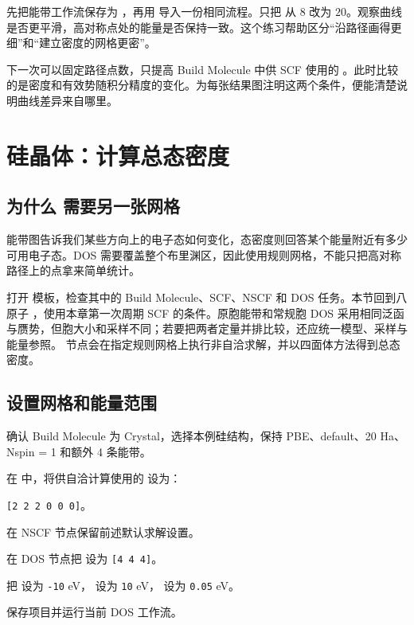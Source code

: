 先把能带工作流保存为 ，再用  导入一份相同流程。只把 \mbox{} 从 $8$ 改为 $20$。观察曲线是否更平滑，高对称点处的能量是否保持一致。这个练习帮助区分“沿路径画得更细”和“建立密度的网格更密”。

下一次可以固定路径点数，只提高 Build Molecule 中供 SCF 使用的 \mbox{}。此时比较的是密度和有效势随积分精度的变化。为每张结果图注明这两个条件，便能清楚说明曲线差异来自哪里。

\section{硅晶体：计算总态密度}

\subsection{为什么  需要另一张网格}

能带图告诉我们某些方向上的电子态如何变化，态密度则回答某个能量附近有多少可用电子态。DOS 需要覆盖整个布里渊区，因此使用规则网格，不能只把高对称路径上的点拿来简单统计。

打开  模板，检查其中的 Build Molecule、SCF、NSCF 和 DOS 任务。本节回到八原子 ，使用本章第一次周期 SCF 的条件。原胞能带和常规胞 DOS 采用相同泛函与赝势，但胞大小和采样不同；若要把两者定量并排比较，还应统一模型、采样与能量参照。 节点会在指定规则网格上执行非自洽求解，并以四面体方法得到总态密度。

\subsection{设置网格和能量范围}

\begin{steps}
\item 确认 Build Molecule 为 Crystal，选择本例硅结构，保持 PBE、default、20 Ha、Nspin = 1 和额外 4 条能带。
\item 在  中，将供自洽计算使用的 \mbox{} 设为：
\par\nobreak\noindent\mbox{\texttt{[2 2 2 0 0 0]}}。
\item 在 NSCF 节点保留前述默认求解设置。
\item 在 DOS 节点把  设为 \texttt{[4 4 4]}。
\item 把  设为 \texttt{-10} eV， 设为 \texttt{10} eV， 设为 \texttt{0.05} eV。
\item 保存项目并运行当前 DOS 工作流。
\end{steps}

